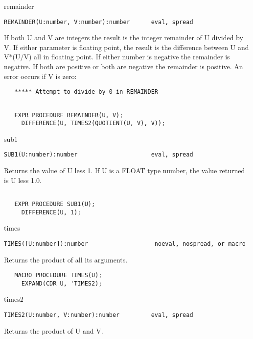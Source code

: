 \begin{Function}{remainder}
\begin{verbatim}
REMAINDER(U:number, V:number):number      eval, spread
\end{verbatim}
   If  both  U  and V  are  integers the  result  is  the integer
   remainder  of U divided by V.  If either parameter is floating
   point,  the  result is  the difference  between U  and V*(U/V)
   all  in  floating point.    If either  number is  negative the
   remainder  is  negative.   If  both are  positive or  both are
   negative  the remainder is positive.   An error occurs if V is
   zero:
\begin{verbatim}
   ***** Attempt to divide by 0 in REMAINDER
\end{verbatim}
\begin{verbatim}

   EXPR PROCEDURE REMAINDER(U, V);
     DIFFERENCE(U, TIMES2(QUOTIENT(U, V), V));
\end{verbatim}
\end{Function}
\begin{Function}{sub1}
\begin{verbatim}
SUB1(U:number):number                     eval, spread
\end{verbatim}
   Returns  the value of U less 1.   If U is a FLOAT type number,
   the value returned is U less 1.0.
\begin{verbatim}

   EXPR PROCEDURE SUB1(U);
     DIFFERENCE(U, 1);
\end{verbatim}
\end{Function}
\begin{Function}{times}
\begin{verbatim}
TIMES([U:number]):number                   noeval, nospread, or macro
\end{verbatim}
   Returns the product of all its arguments.
\begin{verbatim}
   MACRO PROCEDURE TIMES(U);
     EXPAND(CDR U, 'TIMES2);
\end{verbatim}
\end{Function}
\begin{Function}{times2}
\begin{verbatim}
TIMES2(U:number, V:number):number         eval, spread
\end{verbatim}
   Returns the product of U and V.
\end{Function}



